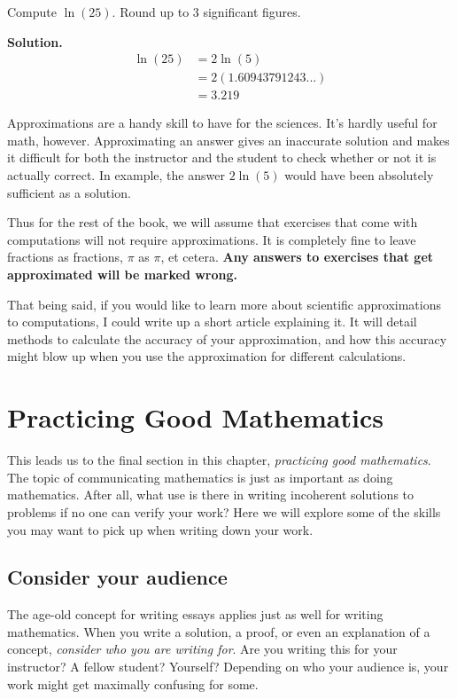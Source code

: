 \begin{example}
Compute $\ln(25)$. Round up to 3 significant figures.
\end{example}
\textbf{Solution.}
\begin{align*}
    \ln(25) &= 2\ln(5)\\
            &= 2(1.60943791243...)\\
            &= 3.219
\end{align*}

Approximations are a handy skill to have for the sciences. It's hardly useful for math, however. Approximating an answer gives an inaccurate solution and makes it difficult for both the instructor and the student to check whether or not it is actually correct. In example, the answer $2\ln(5)$ would have been absolutely sufficient as a solution. 

Thus for the rest of the book, we will assume that exercises that come with computations will not require approximations. It is completely fine to leave fractions as fractions, $\pi$ as $\pi$, et cetera. \textbf{Any answers to exercises that get approximated will be marked wrong.}

That being said, if you would like to learn more about scientific approximations to computations, I could write up a short article explaining it. It will detail methods to calculate the accuracy of your approximation, and how this accuracy might blow up when you use the approximation for different calculations.

\section{Practicing Good Mathematics}

This leads us to the final section in this chapter, \textit{practicing good mathematics}. The topic of communicating mathematics is just as important as doing mathematics. After all, what use is there in writing incoherent solutions to problems if no one can verify your work? Here we will explore some of the skills you may want to pick up when writing down your work.

\subsection{Consider your audience}

The age-old concept for writing essays applies just as well for writing mathematics. When you write a solution, a proof, or even an explanation of a concept, \textit{consider who you are writing for}. Are you writing this for your instructor? A fellow student? Yourself? Depending on who your audience is, your work might get maximally confusing for some. 


